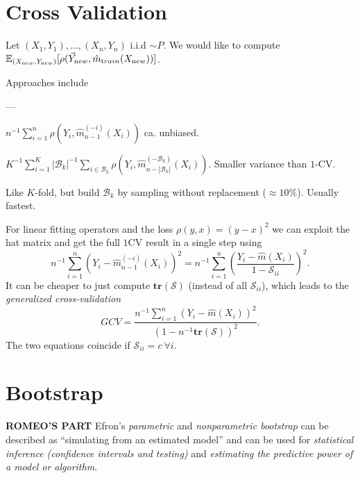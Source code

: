 \section{Cross Validation}\label{sec:cross-validation}
Let $(X_{1}, Y_{1}), \dots, (X_{n}, Y_{n})$ i.i.d $\sim P$.
We would like to compute $\mathbb{E}_{(X_{\textrm new}, Y_{\textrm new})}[\rho(\vec{Y}_{\textrm new}, \hat{m}_{\textrm train} (X_{\textrm new}))]$.
\begin{sectionbox}\nospacing{}
  Approaches include
  \begin{description}[topsep=0pt,itemsep=-1ex,partopsep=1ex,parsep=1ex]
    \item[Validation set:] ---
    \item[Leave-one-out CV:] $n^{-1}\sum_{i=1}^{n}\rho\left(Y_{i}, \hat{m}_{n-1}^{(-i)}(X_{i})\right)$ ca. unbiased.
    \item[$K$-fold CV:] $K^{-1}\sum_{i=1}^{K}|\mathcal{B}_{k}|^{-1}\sum_{i\in\mathcal{B}_{k}}\rho\left(Y_{i}, \hat{m}_{n-|\mathcal{B}_{k}|}^{(-\mathcal{B}_{k})}(X_{i})\right)$. Smaller variance than $1$-CV.
    \item[Random division:] Like $K$-fold, but build $\mathcal{B}_{k}$ by sampling without replacement ($\approx 10\%$). Usually fastest.
  \end{description}
\end{sectionbox}
\begin{sectionbox}\nospacing{}
  For linear fitting operators and the loss $\rho(y, x) = (y-x)^{2}$ we can exploit the hat matrix and get the full $1$CV result in a single step using
  \[
    n^{-1}\sum_{i=1}^{n}\left(Y_{i}-\hat{m}_{n-1}^{(-i)}(X_{i})\right)^{2} = n^{-1}\sum_{i=1}^{n}\left(\frac{Y_{i}-\hat{m}(X_{i})}{1-\mathcal{S}_{ii}}\right)^{2}.
  \]
  It can be cheaper to just compute $\mathbf{tr}(\mathcal{S})$ (instead of all $\mathcal{S}_{ii}$), which leads to the \emph{generalized cross-validation}
  \[
    GCV = \frac{n^{-1}\sum_{i=1}^{n}(Y_{i}-\hat{m}(X_{i}))^{2}}{(1-n^{-1}\mathbf{tr}(\mathcal{S}))^{2}}.
  \]
  The two equations coincide if $\mathcal{S}_{ii}=c\ \forall i$.
\end{sectionbox}

\section{Bootstrap}\label{sec:bootstrap}
\textbf{ROMEO'S PART}
Efron's \emph{parametric} and \emph{nonparametric bootstrap} can be described as ``simulating from an estimated model'' and can be used for \emph{statistical inference (confidence intervals and testing)} and \emph{estimating the predictive power of a model or algorithm}.

